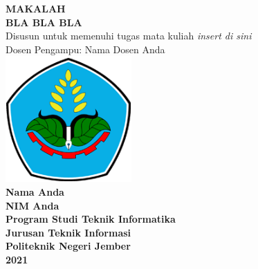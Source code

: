 \documentclass[12pt, a4paper]{report}
\begin{document}
\begin{center}


  {\huge \bfseries MAKALAH\\[0.7em]BLA BLA BLA}
  \\[0.7em]
  Disusun untuk memenuhi tugas mata kuliah {\it insert di sini}
  \\[0.3em]
  Dosen Pengampu: Nama Dosen Anda
  \\[5em]
  \includegraphics[width=13em]{figs/poliyeay.png}
  \\[5em]
{\normalfont \bfseries Nama Anda}
  \\[0.7em]
{\normalfont \bfseries NIM Anda}
  \\[5em]
{\Large \bfseries Program Studi Teknik Informatika}
  \\[0.7em]
{\Large \bfseries Jurusan Teknik Informasi}
  \\[0.7em]
{\Large \bfseries Politeknik Negeri Jember}
  \\[0.7em]
{\Large \bfseries 2021}

\end{center}
\end{document}
